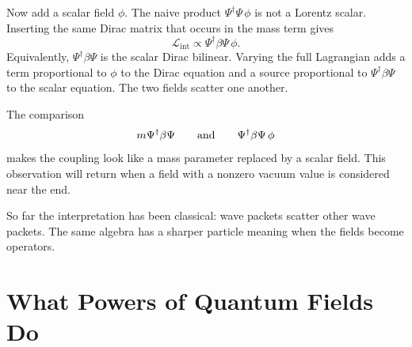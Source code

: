 \begin{classroomqa}
\end{classroomqa}

Now add a scalar field \(\phi\). The naive product \(\Psi^\dagger\Psi\,\phi\) is not a Lorentz scalar. Inserting the same Dirac matrix that occurs in the mass term gives
\begin{equation}
\mathcal L_{\mathrm{int}}
\propto
\Psi^\dagger\beta\Psi\,\phi.
\end{equation}
Equivalently, \(\Psi^\dagger\beta\Psi\) is the scalar Dirac bilinear. Varying the full Lagrangian adds a term proportional to \(\phi\) to the Dirac equation and a source proportional to \(\Psi^\dagger\beta\Psi\) to the scalar equation. The two fields scatter one another.

\begin{classroomqa}
\end{classroomqa}

The comparison
\begin{equation}
m\Psi^\dagger\beta\Psi
\qquad\hbox{and}\qquad
\Psi^\dagger\beta\Psi\,\phi
\end{equation}
makes the coupling look like a mass parameter replaced by a scalar field. This observation will return when a field with a nonzero vacuum value is considered near the end.

So far the interpretation has been classical: wave packets scatter other wave packets. The same algebra has a sharper particle meaning when the fields become operators.

\section{What Powers of Quantum Fields Do}

